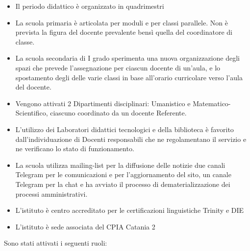 \documentclass[12pt,a4paper,oneside]{memoir}
\begin{document}
\begin{itemize}
    \item Il periodo didattico è organizzato in quadrimestri 
    \item La scuola primaria è articolata per moduli e per classi parallele. Non è prevista la figura del docente prevalente bensì quella del coordinatore di classe. 
    \item La scuola secondaria di I grado sperimenta una nuova organizzazione degli spazi che prevede l’assegnazione per ciascun docente di un’aula, e lo spostamento degli delle varie classi in base all’orario curricolare verso l’aula del docente. 
    \item Vengono attivati 2 Dipartimenti disciplinari: Umanistico e Matematico-Scientifico, ciascuno coordinato da un docente Referente. 
    \item L’utilizzo dei Laboratori didattici tecnologici e della biblioteca è favorito dall’individuazione di Docenti responsabili che ne regolamentano il servizio e ne verificano lo stato di funzionamento. 
    \item La scuola utilizza mailing-list per la diffusione delle notizie due canali Telegram per le comunicazioni e per l’aggiornamento del sito, un canale Telegram per la chat e ha avviato il processo di dematerializzazione dei processi amministrativi. 
    \item L’istituto è centro accreditato per le certificazioni linguistiche Trinity e DIE 
    \item L’istituto è sede associata del CPIA Catania 2
\end{itemize}
Sono stati attivati i seguenti ruoli:
\end{document}
